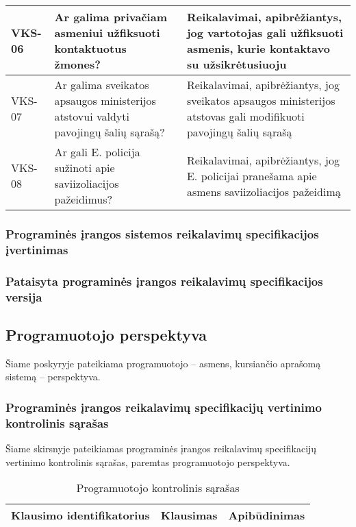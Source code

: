 \documentclass{VUMIFPSkursinis}
\begin{document}
\begin{center}
\begin{longtable}{|C{2cm}|L{5cm}|L{8cm}|}
 					VKS-06 &
 					Ar galima privačiam asmeniui užfiksuoti kontaktuotus žmones?& 
 					Reikalavimai, apibrėžiantys, jog vartotojas gali užfiksuoti asmenis, kurie kontaktavo su užsikrėtusiuoju\\ \hline  
 					VKS-07 &
 					Ar galima sveikatos apsaugos ministerijos atstovui valdyti pavojingų šalių sąrašą?& 
 					Reikalavimai, apibrėžiantys, jog sveikatos apsaugos ministerijos atstovas gali modifikuoti pavojingų šalių sąrašą\\ \hline  
 					VKS-08 &
 					Ar gali E. policija sužinoti apie saviizoliacijos pažeidimus?& 
 					Reikalavimai, apibrėžiantys, jog E. policijai pranešama apie asmens saviizoliacijos pažeidimą\\ \hline			
				\end{longtable}
			\end{center}			

\subsubsection{Programinės įrangos sistemos reikalavimų specifikacijos įvertinimas}

\subsubsection{Pataisyta programinės įrangos reikalavimų specifikacijos versija}
\subsection{Programuotojo perspektyva}

Šiame poskyryje pateikiama programuotojo -- asmens, kursiančio aprašomą sistemą -- perspektyva.

\subsubsection{Programinės įrangos reikalavimų specifikacijų vertinimo kontrolinis sąrašas}

Šiame skirsnyje pateikiamas programinės įrangos reikalavimų specifikacijų vertinimo kontrolinis sąrašas,
paremtas programuotojo perspektyva.

\begin{center}
	\small
	\begin{longtable}{|L{3cm}|C{5cm}|C{7cm}|}
		\caption{Programuotojo kontrolinis sąrašas}
		\label{table:EmployeeSalary}
		\\ \hline
		Klausimo identifikatorius &
		Klausimas                 &
		Apibūdinimas                \\ \hline
	\end{longtable}
\end{center}
\end{document}
